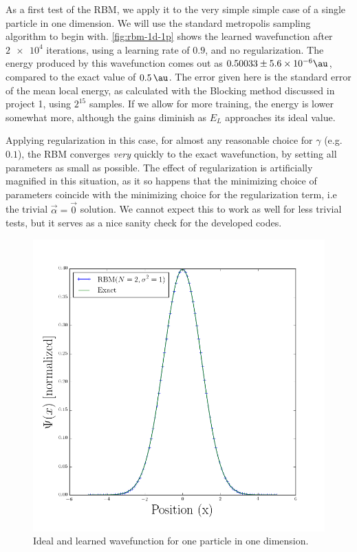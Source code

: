 \documentclass[a4paper, 11pt]{article}
\begin{document}
\begin{multicols}{2}
    As a first test of the RBM, we apply it to the very simple simple case of a
    single particle in one dimension. We will use the standard metropolis
    sampling algorithm to begin with. \autoref{fig:rbm-1d-1p} shows the learned
    wavefunction after $\num{2e4}$ iterations, using a learning rate of $0.9$,
    and no regularization. The energy produced by this wavefunction comes out as
    $0.50033\pm \num{5.6e-6}\si{\au}$, compared to the exact value of
    $\SI{0.5}{\au}$. The error given here is the standard error of the mean
    local energy, as calculated with the Blocking method discussed in project 1,
    using $2^{15}$ samples. If we allow for more training, the energy is lower
    somewhat more, although the gains diminish as $E_L$ approaches its ideal
    value.

    Applying regularization in this case, for almost any reasonable choice for
    $\gamma$ (e.g. $0.1$), the RBM converges \emph{very} quickly to the exact
    wavefunction, by setting all parameters as small as possible. The effect of
    regularization is artificially magnified in this situation, as it so happens
    that the minimizing choice of parameters coincide with the minimizing choice
    for the regularization term, i.e the trivial $\vec\alpha=\vec 0$ solution.
    We cannot expect this to work as well for less trivial tests, but it serves
    as a nice sanity check for the developed codes.


\end{multicols}

\begin{figure}[ht]
    \centering
    \includegraphics[width=0.8\linewidth]{../results/rbm-1d-1p.png}
    \caption{Ideal and learned wavefunction for one particle in one dimension.}
    \label{fig:rbm-1d-1p}
\end{figure}
\end{document}
